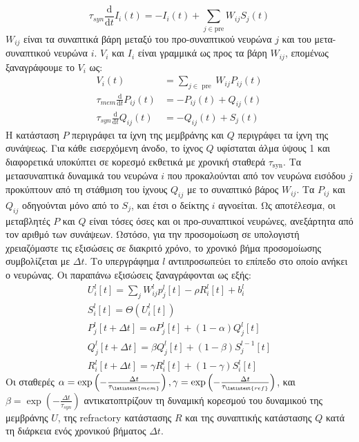 \documentclass[12pt]{report}
\begin{document}
\begin{equation}
\tau_{s y n} \frac{\mathrm{d}}{\mathrm{d} t} I_{i}(t)=-I_{i}(t)+\sum_{j \in \mathrm{pre}} W_{i j} S_{j}(t)
\end{equation}
$W_{i j}$ είναι τα συναπτικά βάρη μεταξύ του προ-συναπτικού νευρώνα $j$ και του μετα-συναπτικού νευρώνα $i$. $V_{i}$ και $I_{i}$ είναι γραμμικά ως προς τα βάρη $W_{i j}$, επομένως ξαναγράφουμε το $ V_ {i} $ ως:
\begin{equation}
\begin{aligned}
V_{i}(t) &=\sum_{j \in \text { pre }} W_{i j} P_{i j}(t) \\
\tau_{m e m} \frac{\mathrm{d}}{\mathrm{d} t} P_{i j}(t) &=-P_{i j}(t)+Q_{i j}(t) \\
\tau_{s y n} \frac{\mathrm{d}}{\mathrm{d} t} Q_{i j}(t) &=-Q_{i j}(t)+S_{j}(t)
\end{aligned}
\end{equation}
Η κατάσταση $P$  περιγράφει τα ίχνη της μεμβράνης και $Q$  περιγράφει τα ίχνη της συνάψεως. Για κάθε εισερχόμενη άνοδο, το ίχνος $Q$ υφίσταται άλμα ύψους 1 και διαφορετικά υποκύπτει σε κορεσμό εκθετικά με χρονική σταθερά $\tau_{\mathrm{syn}}$. Τα μετασυναπτικά δυναμικά του νευρώνα $i$ που προκαλούνται από τον νευρώνα εισόδου $j$ προκύπτουν από τη στάθμιση του ίχνους $Q_{i j}$ με το συναπτικό βάρος $W_{i j}$. Τα $P_{i j}$ και $Q_{i j}$ οδηγούνται μόνο από το $S_{j}$, και έτσι ο δείκτης $i$ αγνοείται. Ως αποτέλεσμα, οι μεταβλητές $P$ και $Q$ είναι τόσες όσες και οι προ-συναπτικοί νευρώνες, ανεξάρτητα από τον αριθμό των συνάψεων.
Ωστόσο, για την προσομοίωση σε υπολογιστή χρειαζόμαστε τις εξισώσεις σε διακριτό χρόνο, το χρονικό βήμα προσομοίωσης συμβολίζεται με $\Delta t$. Το υπεργράφημα $l$ αντιπροσωπεύει το επίπεδο στο οποίο ανήκει ο νευρώνας. Οι παραπάνω εξισώσεις ξαναγράφονται ως εξής:
\begin{equation}
\begin{aligned}
U_{i}^{l}[t]=\sum_{j} W_{i j}^{l} p_{j}^{l}[t]-\rho R_{i}^{l}[t]+b_{i}^{l} \\
S_{i}^{l}[t]=\Theta\left(U_{i}^{l}[t]\right) \\
P_{j}^{l}[t+\Delta t]=\alpha P_{j}^{l}[t]+(1-\alpha) Q_{j}^{l}[t] \\
Q_{j}^{l}[t+\Delta t]=\beta Q_{j}^{l}[t]+(1-\beta) S_{j}^{l-1}[t] \\
R_{i}^{l}[t+\Delta t]=\gamma R_{i}^{l}[t]+(1-\gamma) S_{i}^{l}[t]
\end{aligned}
\end{equation}
Οι σταθερές $\alpha=\exp \left(-\frac{\Delta t}{\tau_{\latintext {mem }}}\right), \gamma=\exp \left(-\frac{\Delta t}{\tau_{\latintext {ref }}}\right)$, και $\beta=\exp \left(-\frac{\Delta t}{\tau_{s y n}}\right)$ αντικατοπτρίζουν τη δυναμική κορεσμού του δυναμικού της μεμβράνης $U$, της \textlatin{refractory} κατάστασης $R$ και της συναπτικής κατάστασης $Q$ κατά τη διάρκεια ενός χρονικού βήματος $\Delta t$.
\end{document}
